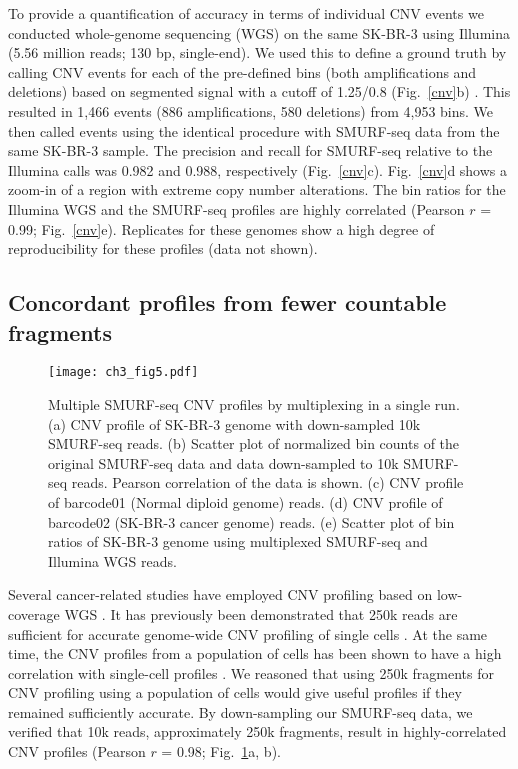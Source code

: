 To provide a quantification of accuracy in terms of individual CNV
events we conducted whole-genome sequencing (WGS) on the same SK-BR-3
using Illumina (5.56 million reads; 130 bp, single-end).  We used this
to define a ground truth by calling CNV events for each of the
pre-defined bins (both amplifications and deletions) based on segmented
signal with a cutoff of 1.25/0.8 (Fig.~\ref{cnv}b)
\citep{dago2014rapid,berry2017potential}. This resulted in 1,466 events
(886 amplifications, 580 deletions) from 4,953 bins. We then called
events using the identical procedure with SMURF-seq data from the same
SK-BR-3 sample. The precision and recall for SMURF-seq relative to the
Illumina calls was 0.982 and 0.988, respectively (Fig.~\ref{cnv}c).
Fig.~\ref{cnv}d shows a zoom-in of a region with extreme copy number
alterations. The bin ratios for the Illumina WGS and the SMURF-seq
profiles are highly correlated (Pearson $r$ = 0.99; Fig.~\ref{cnv}e).
Replicates for these genomes show a high degree of reproducibility for
these profiles (data not shown).

\subsection{Concordant profiles from fewer countable fragments}
\begin{figure}[t!]
\centering
\texttt{[image: ch3\_fig5.pdf]}
\caption{Multiple SMURF-seq CNV profiles by multiplexing in a single run.
  (a) CNV profile of SK-BR-3 genome with down-sampled 10k SMURF-seq reads.
  (b) Scatter plot of normalized bin counts of the original SMURF-seq
  data and data down-sampled to 10k SMURF-seq reads. Pearson
  correlation of the data is shown.
  (c) CNV profile of barcode01 (Normal diploid genome) reads.
  (d) CNV profile of barcode02 (SK-BR-3 cancer genome) reads.
  (e) Scatter plot of bin ratios of SK-BR-3 genome using
  multiplexed SMURF-seq and Illumina WGS reads.}
\label{cnv_mux}
\end{figure}

Several cancer-related studies have employed CNV profiling based on
low-coverage WGS \citep{macintyre2018copy,kader2016copy}.  It has
previously been demonstrated that 250k reads are sufficient for accurate
genome-wide CNV profiling of single cells \citep{baslan2015optimizing}.
At the same time, the CNV profiles from a population of cells has been
shown to have a high correlation with single-cell profiles
\citep{navin2011tumour,baslan2015optimizing}. We reasoned that using 250k
fragments for CNV profiling using a population of cells would give
useful profiles if they remained sufficiently accurate.  By
down-sampling our SMURF-seq data, we verified that 10k reads,
approximately 250k fragments, result in highly-correlated CNV profiles
(Pearson $r$ = 0.98; Fig.~\ref{cnv_mux}a, b).

